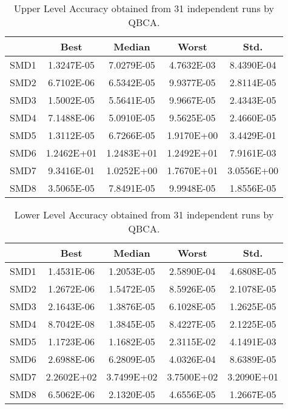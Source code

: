 \documentclass[conference]{IEEEtran}
\theoremstyle{definition}
\begin{document}
\begin{table}[!ht]
    \caption{Upper Level Accuracy obtained from 31 independent runs by QBCA.}
    \label{tab:ul-accur}
    \centering
    \begin{tabular}{ccccc}
        \hline
        & Best &  Median  &  Worst &  Std. \\ \hline
        SMD1 & 1.3247E-05 & 7.0279E-05 %
        & 4.7632E-03 & 8.4390E-04 \\ \hline 
        SMD2 & 6.7102E-06 & 6.5342E-05 %
        & 9.9377E-05 & 2.8114E-05 \\ \hline 
        SMD3 & 1.5002E-05 & 5.5641E-05 %
        & 9.9667E-05 & 2.4343E-05 \\ \hline 
        SMD4 & 7.1488E-06 & 5.0910E-05 %
        & 9.5625E-05 & 2.4660E-05 \\ \hline 
        SMD5 & 1.3112E-05 & 6.7266E-05 %
        & 1.9170E+00 & 3.4429E-01 \\ \hline 
        SMD6 & 1.2462E+01 & 1.2483E+01 %
        & 1.2492E+01 & 7.9161E-03 \\ \hline 
        SMD7 & 9.3416E-01 & 1.0252E+00 %
        & 1.7670E+01 & 3.0556E+00 \\ \hline 
        SMD8 & 3.5065E-05 & 7.8491E-05 %
        & 9.9948E-05 & 1.8556E-05 \\ \hline 
 
    \end{tabular}
\end{table}
% 
\begin{table}[!ht]
    \caption{Lower Level Accuracy obtained from 31 independent runs by QBCA.}
    \label{tab:ll-accur}
    \centering
    \begin{tabular}{ccccc}
        \hline
        & Best &  Median  &  Worst &  Std. \\ \hline

        SMD1 & 1.4531E-06 & 1.2053E-05 %
        & 2.5890E-04 & 4.6808E-05 \\ \hline 
        SMD2 & 1.2672E-06 & 1.5472E-05 %
        & 8.5926E-05 & 2.1078E-05 \\ \hline 
        SMD3 & 2.1643E-06 & 1.3876E-05 %
        & 6.1028E-05 & 1.2625E-05 \\ \hline 
        SMD4 & 8.7042E-08 & 1.3845E-05 %
        & 8.4227E-05 & 2.1225E-05 \\ \hline 
        SMD5 & 1.1723E-06 & 1.1682E-05 %
        & 2.3115E-02 & 4.1491E-03 \\ \hline 
        SMD6 & 2.6988E-06 & 6.2809E-05 %
        & 4.0326E-04 & 8.6389E-05 \\ \hline 
        SMD7 & 2.2602E+02 & 3.7499E+02 %
        & 3.7500E+02 & 3.2090E+01 \\ \hline 
        SMD8 & 6.5062E-06 & 2.1320E-05 %
        & 4.6556E-05 & 1.2667E-05 \\ \hline 

    \end{tabular}
\end{table}
\end{document}
